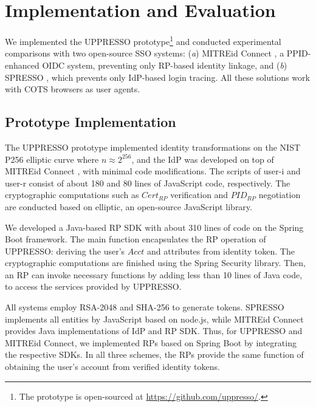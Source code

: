 \section{Implementation and Evaluation}
\label{sec:implementation}

We implemented the UPPRESSO prototype\footnote{The prototype is open-sourced at \url{https://github.com/uppresso/}.} and conducted experimental comparisons with two open-source SSO systems:
 (\emph{a}) MITREid Connect \cite{MITREid}, a PPID-enhanced OIDC system, %
  preventing only RP-based identity linkage,
 and (\emph{b}) SPRESSO \cite{SPRESSO}, which prevents only IdP-based login tracing.
All these solutions work with COTS browsers as user agents.

\subsection{Prototype Implementation}
\label{subsec:proto-imple}

The UPPRESSO prototype implemented identity transformations on the NIST P256 elliptic curve where $n \approx 2^{256}$,
and the IdP was developed on top of MITREid Connect \cite{MITREid}, %
with minimal code modifications.
The scripts of user-i and user-r consist of about 180 and 80 lines of JavaScript code, respectively.  %
The cryptographic computations such as $Cert_{RP}$ verification and $PID_{RP}$ negotiation are conducted based on elliptic\cite{elliptic}, an open-source JavaScript library.

We developed a Java-based RP SDK with about 310 lines of code on the Spring Boot framework.
The main function encapsulates the RP operation of UPPRESSO: deriving the user's $Acct$ and attributes from identity token. The cryptographic computations are finished using the Spring Security library.
Then, an RP can invoke necessary functions by adding less than 10 lines of Java code, to access the services provided by UPPRESSO.
    

All systems employ RSA-2048 and SHA-256 to generate tokens.
SPRESSO implements all entities by JavaScript based on node.js, while MITREid Connect provides Java implementations of IdP and RP SDK.
Thus, for UPPRESSO and MITREid Connect, we implemented RPs based on Spring Boot by integrating the respective SDKs. In all three schemes, the RPs provide the same function of obtaining the user's account from verified identity tokens.


